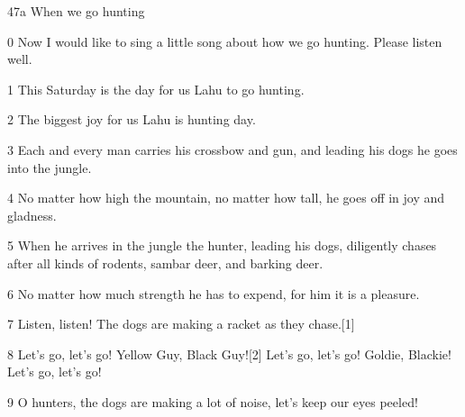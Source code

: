 
{47a When we go hunting}

{0 Now I would like to sing a little song about how we go hunting. Please
listen well.}

{1 This Saturday is the day for us Lahu to go hunting.}

{2 The biggest joy for us Lahu is hunting day.}

{3 Each and every man carries his crossbow and gun, and leading his dogs
he goes into the jungle.}

{4 No matter how high the mountain, no matter how tall, he goes off in joy
and gladness.}

{5 When he arrives in the jungle the hunter, leading his dogs, diligently
chases after all kinds of rodents, sambar deer, and barking deer.}

{6 No matter how much strength he has to expend, for him it is a pleasure.}

{7 Listen, listen! The dogs are making a racket as they chase.[1]}

{8 Let's go, let's go! Yellow Guy, Black Guy![2] Let's go, let's go! Goldie,
Blackie! Let's go, let's go!}

{9 O hunters, the dogs are making a lot of noise, let's keep our eyes peeled!}

